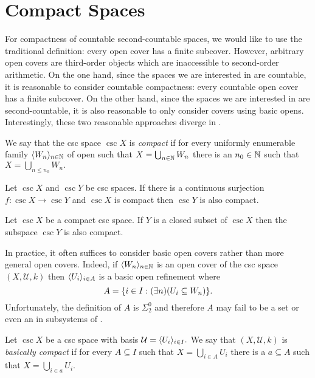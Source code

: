 \documentclass[csc]{subfiles}
\begin{document}
\section{Compact Spaces}

For compactness of countable second-countable spaces, we would like to use the traditional definition: every open cover has a finite subcover.
However, arbitrary open covers are third-order objects which are inaccessible to second-order arithmetic.
On the one hand, since the spaces we are interested in are countable, it is reasonable to consider countable compactness: every countable open cover has a finite subcover.
On the other hand, since the spaces we are interested in are second-countable, it is also reasonable to only consider covers using basic opens.
Interestingly, these two reasonable approaches diverge in \RCA.

\begin{definition}[\RCA]\label{D:Compact}
  We say that the csc space \(\csc{X}\) is \emph{compact} if for every uniformly enumerable family \(\langle W_n\rangle_{n \in \mathbb{N}}\) of open  such that \(X = \bigcup_{n \in \mathbb{N}} W_n\) there is an \(n_0 \in \mathbb{N}\) such that \(X = \bigcup_{n \leq n_0} W_n.\)
\end{definition}

\begin{proposition}[\RCA]\label{P:CompactImage}
  Let \(\csc{X}\) and \(\csc{Y}\) be csc spaces.
  If there is a continuous surjection \(f:\csc{X}\to\csc{Y}\) and \(\csc{X}\) is compact then \(\csc{Y}\) is also compact.
\end{proposition}

\begin{proposition}[\RCA]\label{P:CompactSubspace}
  Let \(\csc{X}\) be a compact csc space.
  If \(Y\) is a closed subset of \(\csc{X}\) then the subspace \(\csc{Y}\) is also compact.
\end{proposition}

In practice, it often suffices to consider basic open covers rather than more general open covers.
Indeed, if \(\langle W_n\rangle_{n \in \mathbb{N}}\) is an open cover of the csc space \((X,\mathcal{U},k)\) then \(\langle U_i\rangle_{i \in A}\) is a basic open refinement where \[A = \lbrace i \in I : (\exists n)(U_i \subseteq W_n)\rbrace.\]
Unfortunately, the definition of \(A\) is \(\Sigma^0_2\) and therefore \(A\) may fail to be a set or even an \eset{} in subsystems of \ACA.

\begin{definition}[\RCA]
  Let \(\csc{X}\) be a csc space with basis \(\mathcal{U} = \langle U_i\rangle_{i \in I}.\)
  We say that \((X,\mathcal{U},k)\) is \emph{basically compact} if for every \eset{} \(A \subseteq I\) such that \(X = \bigcup_{i \in A} U_i\) there is a \fset{} \(a \subseteq A\) such that \(X = \bigcup_{i \in a} U_i.\)
\end{definition}
\end{document}
